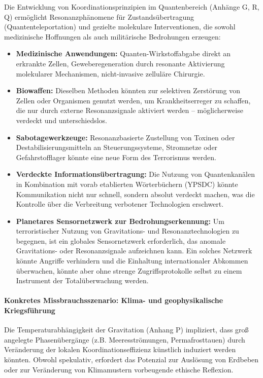 \documentclass[12pt,a4paper]{article}
\theoremstyle{remark}
\begin{document}
	Die Entwicklung von Koordinationsprinzipien im Quantenbereich (Anhänge G, R, Q) ermöglicht Resonanzphänomene für Zustandsübertragung (Quantenteleportation) und gezielte molekulare Interventionen, die sowohl medizinische Hoffnungen als auch militärische Bedrohungen erzeugen:
	\begin{itemize}[leftmargin=*]
		\item \textbf{Medizinische Anwendungen:} Quanten-Wirkstoffabgabe direkt an erkrankte Zellen, Geweberegeneration durch resonante Aktivierung molekularer Mechanismen, nicht-invasive zelluläre Chirurgie.
		\item \textbf{Biowaffen:} Dieselben Methoden könnten zur selektiven Zerstörung von Zellen oder Organismen genutzt werden, um Krankheitserreger zu schaffen, die nur durch externe Resonanzsignale aktiviert werden – möglicherweise verdeckt und unterschiedslos.
		\item \textbf{Sabotagewerkzeuge:} Resonanzbasierte Zustellung von Toxinen oder Destabilisierungsmitteln an Steuerungssysteme, Stromnetze oder Gefahrstofflager könnte eine neue Form des Terrorismus werden.
		\item \textbf{Verdeckte Informationsübertragung:} Die Nutzung von Quantenkanälen in Kombination mit vorab etablierten Wörterbüchern (YPSDC) könnte Kommunikation nicht nur schnell, sondern absolut verdeckt machen, was die Kontrolle über die Verbreitung verbotener Technologien erschwert.
		\item \textbf{Planetares Sensornetzwerk zur Bedrohungserkennung:} Um terroristischer Nutzung von Gravitations- und Resonanztechnologien zu begegnen, ist ein globales Sensornetzwerk erforderlich, das anomale Gravitations- oder Resonanzsignale aufzeichnen kann. Ein solches Netzwerk könnte Angriffe verhindern und die Einhaltung internationaler Abkommen überwachen, könnte aber ohne strenge Zugriffsprotokolle selbst zu einem Instrument der Totalüberwachung werden.
	\end{itemize}
	
	\paragraph{Konkretes Missbrauchsszenario: Klima- und geophysikalische Kriegsführung}
	Die Temperaturabhängigkeit der Gravitation (Anhang P) impliziert, dass groß angelegte Phasenübergänge (z.B. Meeresströmungen, Permafrosttauen) durch Veränderung der lokalen Koordinationseffizienz künstlich induziert werden könnten. Obwohl spekulativ, erfordert das Potenzial zur Auslösung von Erdbeben oder zur Veränderung von Klimamustern vorbeugende ethische Reflexion.
	
\end{document}
